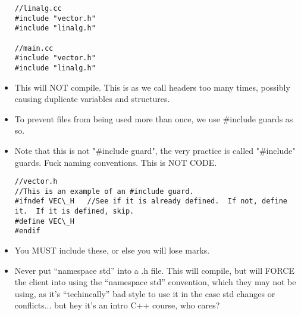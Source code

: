 \documentclass{article}
\begin{document}
\begin{itemize}
\begin{lstlisting}
//linalg.cc
#include "vector.h"
#include "linalg.h"

//main.cc
#include "vector.h"
#include "linalg.h"
\end{lstlisting}
\item This will NOT compile.  This is as we call headers too many times, possibly causing duplicate variables and structures.
\item To prevent files from being used more than once, we use #include guards as so.
\item Note that this is not "#include guard", the very practice is called "#include" guards.  Fuck naming conventions.  This is NOT CODE.
\begin{lstlisting}
//vector.h
//This is an example of an #include guard.
#ifndef VEC\_H   //See if it is already defined.  If not, define it.  If it is defined, skip.
#define VEC\_H
#endif
\end{lstlisting}
\item You MUST include these, or else you will lose marks.
\item Never put ``namespace std'' into a .h file.  This will compile, but will FORCE the client into using the ``namespace std'' convention, which they may not be using, as it's ``techincally'' bad style to use it in the case std changes or conflicts... but hey it's an intro C++ course, who cares?
\end{itemize}
\end{document}
